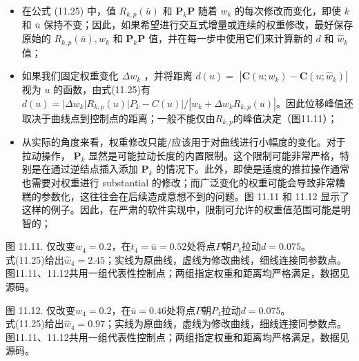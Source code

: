 \documentclass[../main.tex]{subfiles}
\begin{document}
\begin{itemize}
\item 在公式 (11.25) 中，值 \({R}_{k,p}\left( \bar{u}\right)\) 和 \({\mathbf{P}}_{k}\mathbf{P}\) 随着 \({w}_{k}\) 的每次修改而变化，即使 \(k\) 和 \(\bar{u}\) 保持不变；因此，如果希望进行交互式增量或连续的权重修改，最好保存原始的 \({R}_{k,p}\left( \bar{u}\right) ,{w}_{k}\) 和 \({\mathbf{P}}_{k}\mathbf{P}\) 值，并在每一步中使用它们来计算新的 \(d\) 和 \({\widehat{w}}_{k}\) 值；
\end{itemize}

\begin{itemize}
\item 如果我们固定权重变化 \(\Delta {w}_{k}\) ，并将距离 \(d\left( u\right)  =\)  \(\left| {\mathbf{C}\left( {u;{w}_{k}}\right)  - \mathbf{C}\left( {u;{\widehat{w}}_{k}}\right) }\right|\) 视为 \(u\) 的函数，由式(11.25)有$d(u)=|\Delta w_k|R_{k,p}(u)|P_k-C(u)|/|w_k+\Delta w_k R_{k,p}(u)|$。因此位移峰值还取决于曲线点到控制点的距离；一般不能仅由$R_{k,p}$的峰值决定（图11.11）；
\end{itemize}

\begin{itemize}
\item 从实际的角度来看，权重修改只能/应该用于对曲线进行小幅度的变化。对于拉动操作， \({\mathbf{P}}_{k}\) 显然是可能拉动长度的内置限制。这个限制可能非常严格，特别是在通过逆结点插入添加 \({\mathbf{P}}_{k}\) 的情况下。此外，即使是适度的推拉操作通常也需要对权重进行 substantial 的修改；而广泛变化的权重可能会导致非常糟糕的参数化，这往往会在后续造成意想不到的问题。图 11.11 和 11.12 显示了这样的例子。因此，在严肃的软件实现中，限制可允许的权重值范围可能是明智的；
\end{itemize}



\begin{center}
\begin{minipage}{26cm}
\centering
{}
\par\smallskip
图 11.11. 仅改变$w_4=0.2$，在$t_4=\bar u=0.52$处将点$P$朝$P_4$拉动$d=0.075$。\\
式(11.25)给出$\widehat w_4=2.45$；实线为原曲线，虚线为修改曲线，细线连接同参数点。\\
图11.11、11.12共用一组代表性控制点；两组指定权重和距离均严格满足，数据见源码。
\end{minipage}
\end{center}

\begin{center}
\begin{minipage}{26cm}
\centering
{}
\par\smallskip
图 11.12. 仅改变$w_4=0.2$，在$\bar u=0.46$处将点$P$朝$P_4$拉动$d=0.075$。\\
式(11.25)给出$\widehat w_4=0.97$；实线为原曲线，虚线为修改曲线，细线连接同参数点。\\
图11.11、11.12共用一组代表性控制点；两组指定权重和距离均严格满足，数据见源码。
\end{minipage}
\end{center}
\end{document}
